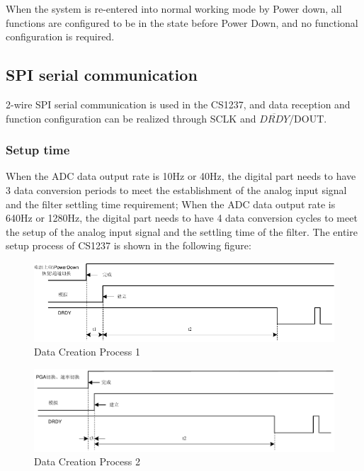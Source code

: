 \documentclass{article}
\begin{document}
When the system is re-entered into normal working mode by Power down, all functions are configured to be in the state before Power Down, and no functional configuration is required.

\pagebreak

\subsection{SPI serial communication}

2-wire SPI serial communication is used in the CS1237, and data reception and function configuration can be realized through SCLK and $\overline{DRDY}$/DOUT.

\subsubsection{Setup time}

When the ADC data output rate is 10Hz or 40Hz, the digital part needs to have 3 data conversion periods to meet the establishment of the analog input signal and the filter settling time requirement; When the ADC data output rate is 640Hz or 1280Hz, the digital part needs to have 4 data conversion cycles to meet the setup of the analog input signal and the settling time of the filter. The entire setup process of CS1237 is shown in the following figure:

\begin{figure}[h]
    \centering
    \includegraphics[width=1\textwidth]{fig5.png}
    \caption{Data Creation Process 1}
    \label{fig:fig5}
\end{figure}

\begin{figure}[h]
    \centering
    \includegraphics[width=1\textwidth]{fig6.png}
    \caption{Data Creation Process 2}
    \label{fig:fig6}
\end{figure}
\end{document}
